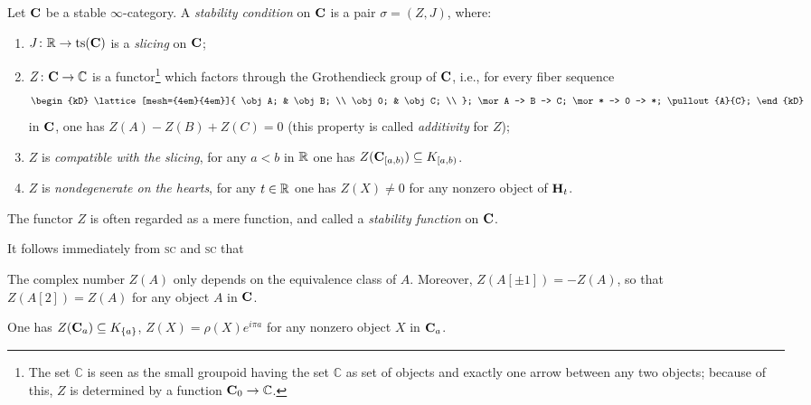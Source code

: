  \begin{definition}\label{la.zeta}
 Let $\textbf{C}$ be a stable $\infty$\hyp{}category. A \emph{stability condition} on $\textbf{C}$ is a pair $\sigma=(Z,J)$, where:
 \begin{enumerate}[label=\textsc{sc}\oldstylenums{\arabic*})]
 \item $J\colon \mathbb{R}\to \mathrm{ts}(\textbf{C})$ is a \emph{slicing} on $\textbf{C}$;
 \item $Z\colon \textbf{C}\to \mathbb{C}$ is a functor\footnote{The set $\mathbb{C}$ is seen as the small groupoid having the set $\mathbb{C}$ as set of objects and exactly one arrow between any two objects; because of this, $Z$ is determined by a function $\textbf{C}_0\to \mathbb{C}$.}  which factors through the Grothendieck group of $\textbf{C}$, i.e., for every fiber sequence 
\[
\begin{kD}
\lattice[mesh={4em}{4em}]{
  \obj A; & \obj B; \\
  \obj 0; & \obj C; \\
};
\mor A -> B -> C;
\mor * -> 0 -> *;
\pullout{A}{C};
\end{kD}
 \]
in $\textbf{C}$, one has $Z(A)-Z(B)+Z(C)=0$ (this property is called \emph{additivity} for $Z$);
\item $Z$ is \emph{compatible with the slicing}, \ie for any $a<b$ in $\mathbb{R}$ one has $Z(\textbf{C}_{[a,b)})\subseteq K_{[a,b)}$. 
\item $Z$ is \emph{nondegenerate on the hearts}, \ie for any $t\in \mathbb{R}$ one has $Z(X)\neq 0$ for any nonzero object of $\textbf{H}_t$.
 \end{enumerate}
The functor $Z$ is often regarded as a mere function, and called a \emph{stability function} on $\textbf{C}$.
 \end{definition}
 It follows immediately from \textsc{sc} and \textsc{sc} that
 \begin{remark}
 The complex number $Z(A)$ only depends on the equivalence class of $A$. Moreover, $Z(A[\pm 1])=-Z(A)$, so that $Z(A[2])=Z(A)$ for any object $A$ in $\textbf{C}$.
 \end{remark}
 \begin{remark}
 
 One has $Z(\textbf{C}_{a})\subseteq K_{\{a\}}$, \ie $Z(X) = \rho(X) e^{i\pi a}$ for any nonzero object $X$ in $\textbf{C}_{a}$.
 \end{remark}

